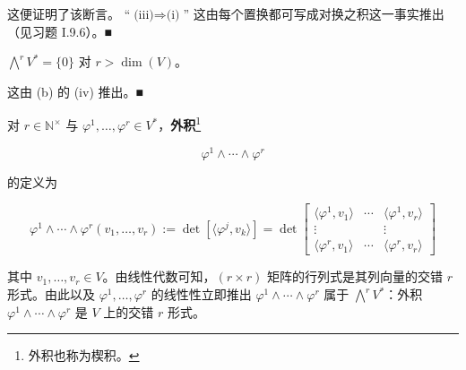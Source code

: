 \begin{remark}
\begin{items}
\begin{subitems}
这便证明了该断言。
“$ \text{(iii)}\Rightarrow\text{(i)} $” 这由每个置换都可写成对换之积这一事实推出（见习题 I.9.6）。\nobreak\hspace{0.35em}■

\end{subitems}

\item

$ \bigwedge^{r}V^{*} = \{0\} $ 对 $ r > \dim(V) $。

\proofhead
这由 (b) 的 (iv) 推出。\nobreak\hspace{0.35em}■
\end{items}

对 $ r \in \mathbb{N}^{\times} $ 与 $ \varphi^{1},\ldots,\varphi^{r} \in V^{*} $，\textbf{外积}\footnote{外积也称为楔积。}

\[
\varphi^{1}\wedge\cdots\wedge\varphi^{r}
\]

的定义为

\begin{equation}
\varphi^{1}\wedge\cdots\wedge\varphi^{r}(v_{1},\ldots,v_{r}) := \det\left[\langle\varphi^{j},v_{k}\rangle\right] = \det\begin{bmatrix} \langle\varphi^{1},v_{1}\rangle & \cdots & \langle\varphi^{1},v_{r}\rangle \\ \vdots & & \vdots \\ \langle\varphi^{r},v_{1}\rangle & \cdots & \langle\varphi^{r},v_{r}\rangle \end{bmatrix}\tag{2.3}
\end{equation}

其中 $ v_{1},\ldots,v_{r} \in V $。由线性代数可知，$ (r\times r) $ 矩阵的行列式是其列向量的交错 $ r $ 形式。由此以及 $ \varphi^{1},\ldots,\varphi^{r} $ 的线性性立即推出 $ \varphi^{1}\wedge\cdots\wedge\varphi^{r} $ 属于 $ \bigwedge^{r}V^{*} $：外积 $ \varphi^{1}\wedge\cdots\wedge\varphi^{r} $ 是 $ V $ 上的交错 $ r $ 形式。

\end{remark}

